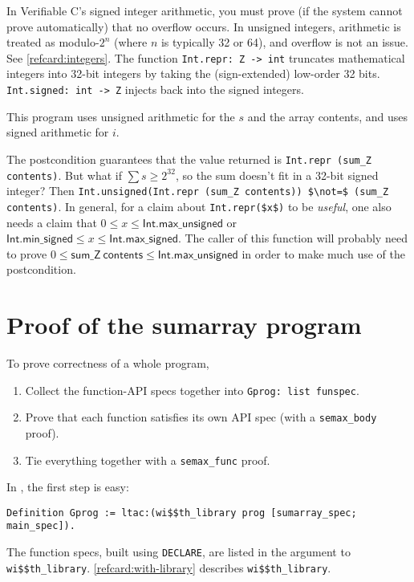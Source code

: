 \documentclass[12pt,fleqn,openany,oneside,showtrims]{memoir}
\begin{document}
In Verifiable C's signed integer arithmetic,
you must prove (if the system cannot prove automatically)
that no overflow occurs.  In unsigned integers,
arithmetic is treated as modulo-$2^{n}$ (where $n$ is typically
32 or 64), and overflow is not an issue.
See \autoref{refcard:integers}.
The function \lstinline{Int.repr: Z -> int} truncates mathematical
integers into 32-bit integers by taking the (sign-extended) low-order
32 bits.  \lstinline{Int.signed: int -> Z} injects back into the signed
integers.

This program uses unsigned arithmetic for the $s$ and the
array contents, and uses signed arithmetic for $i$.

The postcondition guarantees that the value returned is\linebreak
\lstinline{Int.repr (sum_Z contents)}.  But what if
$\sum s \ge 2^{32}$, so the sum doesn't fit in
a 32-bit signed integer?  Then\newline
\lstinline{Int.unsigned(Int.repr (sum_Z contents)) $\not=$ (sum_Z contents)}.  In general, for a claim about \lstinline{Int.repr($x$)} to
be \emph{useful}, one also needs
a claim that $0\le x \le \mathsf{Int.max\_unsigned}$
or $\mathsf{Int.min\_signed} \le x \le \mathsf{Int.max\_signed}$.
The caller of this function will probably need
to prove
$0 \le \mathsf{sum\_Z~contents} \le \mathsf{Int.max\_unsigned}$
in order to make much use of the postcondition.

\chapter{Proof of the \textsf{sumarray} program}
\label{refcard:sumarray-proof}
To prove correctness of a whole program,
\begin{enumerate}
\item Collect the function-API specs together into
  \lstinline{Gprog: list funspec}.
  \item Prove that each function satisfies its own API spec
    (with a \lstinline{semax_body} proof).
  \item Tie everything together with a \lstinline{semax_func} proof.
\end{enumerate}

In , the first step is easy:
\label{refcard:with-library1}
\begin{lstlisting}
Definition Gprog := ltac:(wi$$th_library prog [sumarray_spec; main_spec]).
\end{lstlisting}
The function specs, built using \lstinline{DECLARE},
are listed in the argument to \lstinline{wi$$th_library}.
\autoref{refcard:with-library} describes \lstinline{wi$$th_library}.
\end{document}
